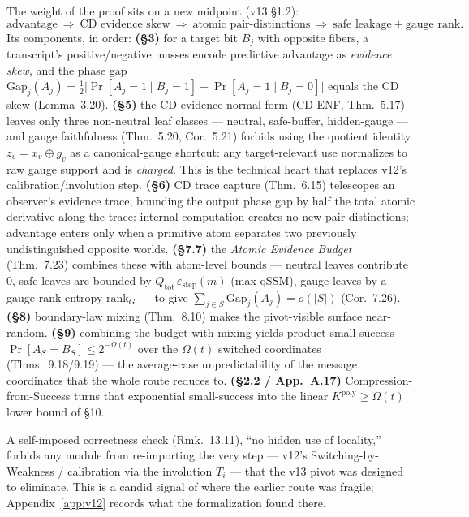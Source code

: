 \documentclass[11pt]{article}
\theoremstyle{definition}
\newcommand{\Kpoly}{K^{\mathrm{poly}}}
\newcommand{\Gap}{\mathrm{Gap}}
\begin{document}
The weight of the proof sits on a new midpoint (v13 \S1.2):
\[
  \text{advantage}\ \Longrightarrow\ \text{CD evidence skew}\ \Longrightarrow\
  \text{atomic pair-distinctions}\ \Longrightarrow\ \text{safe leakage}+\text{gauge rank}.
\]
Its components, in order: \textbf{(\S3)} for a target bit $B_j$ with opposite
fibers, a transcript's positive/negative masses encode predictive advantage as
\emph{evidence skew}, and the phase gap
$\Gap_j(A_j)=\tfrac12\bigl|\Pr[A_j=1\mid B_j=1]-\Pr[A_j=1\mid B_j=0]\bigr|$ equals
the CD skew (Lemma~3.20). \textbf{(\S5)} the CD evidence normal form (CD-ENF,
Thm.~5.17) leaves only three non-neutral leaf classes --- neutral, safe-buffer,
hidden-gauge --- and gauge faithfulness (Thm.~5.20, Cor.~5.21) forbids using the
quotient identity $z_v=x_v\oplus g_v$ as a canonical-gauge shortcut: any
target-relevant use normalizes to raw gauge support and is \emph{charged}. This is
the technical heart that replaces v12's calibration/involution step.
\textbf{(\S6)} CD trace capture (Thm.~6.15) telescopes an observer's evidence
trace, bounding the output phase gap by half the total atomic derivative along the
trace: internal computation creates no new pair-distinctions; advantage enters
only when a primitive atom separates two previously undistinguished opposite
worlds. \textbf{(\S7.7)} the \emph{Atomic Evidence Budget} (Thm.~7.23) combines
these with atom-level bounds --- neutral leaves contribute $0$, safe leaves are
bounded by $Q_{\mathrm{tot}}\,\varepsilon_{\mathrm{step}}(m)$ (max-qSSM), gauge
leaves by a gauge-rank entropy $\mathrm{rank}_G$ --- to give
$\sum_{j\in S}\Gap_j(A_j)=o(|S|)$ (Cor.~7.26). \textbf{(\S8)} boundary-law mixing
(Thm.~8.10) makes the pivot-visible surface near-random. \textbf{(\S9)} combining
the budget with mixing yields product small-success
$\Pr[A_S=B_S]\le 2^{-\Omega(t)}$ over the $\Omega(t)$ switched coordinates
(Thms.~9.18/9.19) --- the average-case unpredictability of the message
coordinates that the whole route reduces to. \textbf{(\S2.2 / App.~A.17)}
Compression-from-Success turns that exponential small-success into the linear
$\Kpoly\ge\Omega(t)$ lower bound of \S10.

A self-imposed correctness check (Rmk.~13.11), ``no hidden use of locality,''
forbids any module from re-importing the very step --- v12's
Switching-by-Weakness / calibration via the involution $T_i$ --- that the v13
pivot was designed to eliminate. This is a candid signal of where the earlier
route was fragile; Appendix~\ref{app:v12} records what the formalization found
there.
\end{document}
